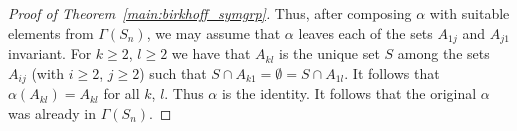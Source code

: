 \begin{proof}[Proof of Theorem~\ref{main:birkhoff_symgrp}]
  Thus, after composing $\alpha$ with suitable elements
  from $\Gamma(S_n)$, 
  we may assume that $\alpha$ leaves each of the sets
  $A_{1j}$ and $A_{j1}$ invariant.
  For $k\geq 2$, $l\geq 2$ we have that
  $A_{kl}$ is the unique set $S$ among the sets
  $A_{ij}$ (with $i\geq 2$, $j\geq 2$)
  such that $S\cap A_{k1}=\emptyset = S\cap A_{1l}$.
  It follows that
  $\alpha(A_{kl})=A_{kl}$ for all $k$, $l$.
  Thus $\alpha$ is the identity.
  It follows that the original $\alpha$ was already in 
  $\Gamma(S_n)$. 
\end{proof}

